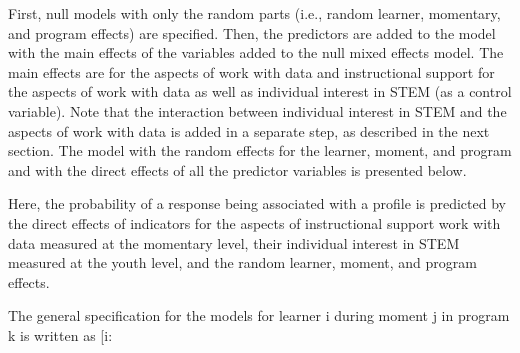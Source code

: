 \documentclass[]{book}
\theoremstyle{definition}
\theoremstyle{definition}
\theoremstyle{definition}
\theoremstyle{remark}
\begin{document}
First, null models with only the random parts (i.e., random learner,
momentary, and program effects) are specified. Then, the predictors are
added to the model with the main effects of the variables added to the
null mixed effects model. The main effects are for the aspects of work
with data and instructional support for the aspects of work with data as
well as individual interest in STEM (as a control variable). Note that
the interaction between individual interest in STEM and the aspects of
work with data is added in a separate step, as described in the next
section. The model with the random effects for the learner, moment, and
program and with the direct effects of all the predictor variables is
presented below.

Here, the probability of a response being associated with a profile is
predicted by the direct effects of indicators for the aspects of
instructional support work with data measured at the momentary level,
their individual interest in STEM measured at the youth level, and the
random learner, moment, and program effects.

The general specification for the models for learner i during moment j
in program k is written as {[}i:
\end{document}
